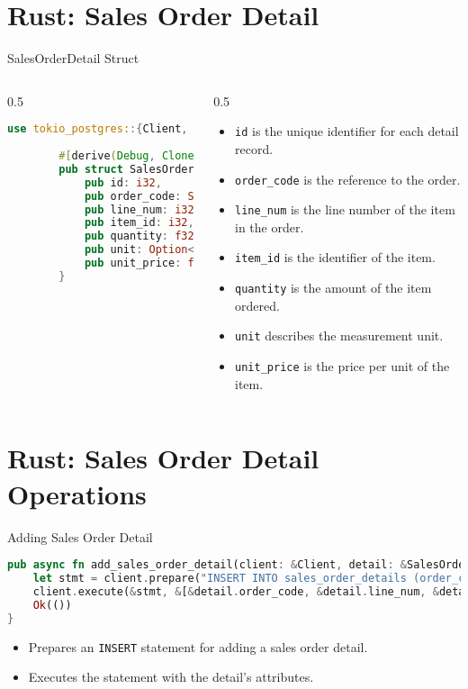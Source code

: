 \documentclass[aspectratio=169, table]{beamer}
\begin{document}
\section{Rust: Sales Order Detail}

\begin{frame}[fragile]{SalesOrderDetail Struct}
\begin{columns}[t]
\begin{column}{0.5\pagewidth}
	\begin{lstlisting}[language=Rust]
		use tokio_postgres::{Client, Error};
		
		#[derive(Debug, Clone)]
		pub struct SalesOrderDetail {
			pub id: i32,
			pub order_code: String,
			pub line_num: i32,
			pub item_id: i32,
			pub quantity: f32,
			pub unit: Option<String>,
			pub unit_price: f32,
		}
	\end{lstlisting}
\end{column}
\begin{column}{0.5\textwidth}
	\begin{itemize}
		\item \texttt{id} is the unique identifier for each detail record.
		\item \texttt{order\_code} is the reference to the order.
		\item \texttt{line\_num} is the line number of the item in the order.
		\item \texttt{item\_id} is the identifier of the item.
		\item \texttt{quantity} is the amount of the item ordered.
		\item \texttt{unit} describes the measurement unit.
		\item \texttt{unit\_price} is the price per unit of the item.
	\end{itemize}
\end{column}
\end{columns}
\end{frame}


\section{Rust: Sales Order Detail Operations}
\begin{frame}[fragile]{Adding Sales Order Detail}
	\begin{lstlisting}[language=Rust]
pub async fn add_sales_order_detail(client: &Client, detail: &SalesOrderDetail) -> Result<(), Error> {
	let stmt = client.prepare("INSERT INTO sales_order_details (order_code, line_num, item_id, quantity, unit, unit_price) VALUES ($1, $2, $3, $4, $5, $6)").await?;
	client.execute(&stmt, &[&detail.order_code, &detail.line_num, &detail.item_id, &detail.quantity, &detail.unit, &detail.unit_price]).await?;
	Ok(())
}
\end{lstlisting}
\begin{itemize}
\item Prepares an \texttt{INSERT} statement for adding a sales order detail.
\item Executes the statement with the detail's attributes.
\end{itemize}
\end{frame}
\end{document}
